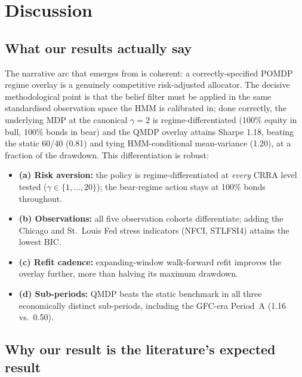 \documentclass[11pt]{article}
\theoremstyle{plain1}
\theoremstyle{definition1}
\newcommand{\1}{\mathbf{1}}
\begin{document}
\section{Discussion}\label{sec:conclusions}

\subsection{What our results actually say}

The narrative arc that emerges from  is coherent: a correctly-specified POMDP regime overlay is a genuinely competitive risk-adjusted allocator. The decisive methodological point is that the belief filter must be applied in the same standardised observation space the HMM is calibrated in; done correctly, the underlying MDP at the canonical $\gamma{=}2$ is regime-differentiated (100\% equity in bull, 100\% bonds in bear) and the QMDP overlay attains Sharpe 1.18, beating the static 60/40 (0.81) and tying HMM-conditional mean-variance (1.20), at a fraction of the drawdown. This differentiation is robust:

\begin{itemize}[leftmargin=1.5em,itemsep=2pt]
  \item \textbf{(a) Risk aversion:} the policy is regime-differentiated at \emph{every} CRRA level tested ($\gamma\in\{1,\dots,20\}$); the bear-regime action stays at 100\% bonds throughout.
  \item \textbf{(b) Observations:} all five observation cohorts differentiate; adding the Chicago and St.\ Louis Fed stress indicators (NFCI, STLFSI4) attains the lowest BIC.
  \item \textbf{(c) Refit cadence:} expanding-window walk-forward refit improves the overlay further, more than halving its maximum drawdown.
  \item \textbf{(d) Sub-periods:} QMDP beats the static benchmark in all three economically distinct sub-periods, including the GFC-era Period~A (1.16 vs.\ 0.50).
\end{itemize}

\subsection{Why our result is the literature's expected result}
\end{document}
